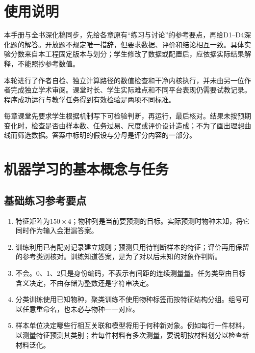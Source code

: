 \chapter*{使用说明}
本手册与全书深化稿同步，先给各章原有“练习与讨论”的参考要点，再给D1--D4深化题的解答。开放题不规定唯一措辞，但要求数据、评价和结论相互一致。具体实验分数来自本工程固定版本与划分；学生修改了数据或配置后，应依据实际结果解释，不能照抄参考数值。

本轮进行了作者自检、独立计算路径的数值检查和干净内核执行，并未由另一位作者完成独立学术审阅。课堂时长、学生实际难点和不同平台表现仍需要试教记录。程序成功运行与教学任务得到有效检验是两项不同标准。

每章课堂先要求学生根据机制写下可检验判断，再运行，最后核对。结果未按预期变化时，检查是否由样本数、任务过易、尺度或评价设计造成；不为了画出理想曲线而筛选数据。答案中标明的假设与分母是评分内容的一部分。

\chapter{机器学习的基本概念与任务}
\section*{基础练习参考要点}
\begin{enumerate}[label=\arabic*.]
\item 特征矩阵为$150\times4$；物种列是当前要预测的目标。实际预测时物种未知，将它同时作为输入会泄漏答案。
\item 训练利用已有配对记录建立规则；预测只用待判断样本的特征；评价再用保留的参考类别核对。训练知道答案，是为了对以后未知的对象作判断。
\item 不会。0、1、2只是身份编码，不表示有间距的连续测量量。任务类型由目标含义决定，不由存储为整数还是字符串决定。
\item 分类训练使用已知物种，聚类训练不使用物种标签而按特征结构分组。组号可以任意重命名，也未必与物种一一对应。
\item 样本单位决定哪些行相互关联和模型将用于何种新对象。例如每行一件材料，以测量特征预测其类别；若每件材料有多次测量，要说明按材料划分以检查新材料泛化。
\end{enumerate}
